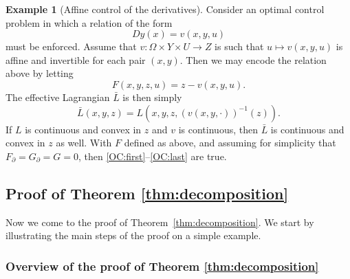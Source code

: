 \documentclass{article}
\theoremstyle{definition}
\newtheorem{example}[theorem]{Example}
\theoremstyle{remark}
\begin{document}
\begin{example}[Affine control of the derivatives]
\label{ex:affine}
 Consider an optimal control problem in which a relation of the form
 \[Dy(x)=v(x,y,u)\]
 must be enforced. Assume that $v\colon \Omega\times Y\times U\to Z$ is such that $u\mapsto v(x,y,u)$ is affine and invertible for each pair $(x,y)$. Then we may encode the relation above by letting 
 \[F(x,y,z,u)=z-v(x,y,u).\]
 The effective Lagrangian $\bar L$ is then simply
 \[\bar L(x,y,z)=L(x,y,z,(v(x,y,\cdot))^{-1}(z)).\]
 If $L$ is continuous and convex in $z$ and $v$ is continuous, then $\bar L$ is continuous and convex in $z$ as well.
 With $F$ defined as above, and assuming for simplicity that $F_\partial=G_\partial=G=0$, then \ref{OC:first}--\ref{OC:last} are true.
\end{example}


\subsection{Proof of Theorem \ref{thm:decomposition} }\label{sec:proofdecomposition}

Now we come to the proof of Theorem~\ref{thm:decomposition}. We start by illustrating the main steps of the proof on a simple example.


\subsubsection{Overview of the proof of Theorem \ref{thm:decomposition}}
\label{sec:overview}
\end{document}
